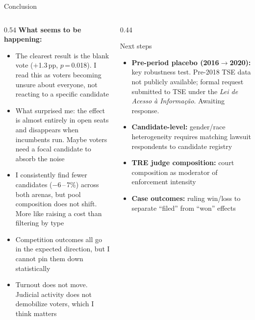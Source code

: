 \documentclass[aspectratio=169,10pt]{beamer}
\begin{document}
\begin{frame}{Conclusion}
\begin{columns}[T]
\begin{column}{0.54\textwidth}
\footnotesize\textbf{What seems to be happening:}
\begin{itemize}
  \item The clearest result is the blank vote ($+$1.3\,pp, $p$\,=\,0.018). I read this as voters becoming unsure about everyone, not reacting to a specific candidate
  \item What surprised me: the effect is almost entirely in open seats and disappears when incumbents run. Maybe voters need a focal candidate to absorb the noise
  \item I consistently find fewer candidates ($-$6\,--\,7\%) across both arenas, but pool composition does not shift. More like raising a cost than filtering by type
  \item Competition outcomes all go in the expected direction, but I cannot pin them down statistically
  \item Turnout does not move. Judicial activity does not demobilize voters, which I think matters
\end{itemize}
\normalsize
\end{column}
\begin{column}{0.44\textwidth}
\begin{block}{Next steps}
  \footnotesize
  \begin{itemize}
    \item \textbf{Pre-period placebo (2016$\to$2020):} key robustness test. Pre-2018 TSE data not publicly available; formal request submitted to TSE under the \emph{Lei de Acesso à Informação}. Awaiting response.
    \item \textbf{Candidate-level:} gender/race heterogeneity requires matching lawsuit respondents to candidate registry
    \item \textbf{TRE judge composition:} court composition as moderator of enforcement intensity
    \item \textbf{Case outcomes:} ruling win/loss to separate ``filed'' from ``won'' effects
  \end{itemize}
\end{block}
\end{column}
\end{columns}
\end{frame}
\end{document}
